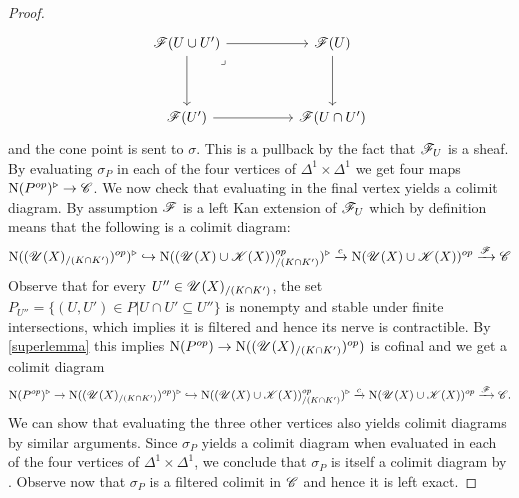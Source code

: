\documentclass[../thesis.tex]{subfiles}
\begin{document}
\begin{proof}
    \[
        \begin{tikzcd}
            {\F(U \cup U')} && {\F(U)} \\
            \\
            {\F(U')} && {\F(U\cap U')}
            \arrow[from=1-3, to=3-3]
            \arrow[from=3-1, to=3-3]
            \arrow[from=1-1, to=3-1]
            \arrow["\lrcorner"{anchor=center, pos=0.125}, draw=none, from=1-1, to=3-3]
            \arrow[from=1-1, to=1-3]
        \end{tikzcd}
    \]
    and the cone point is sent to $\sigma$. This is a pullback by the fact that $\mathscr{F}_{U}$ is a sheaf.
    By evaluating $\sigma_P$ in each of the four vertices of $\Delta^1 \times \Delta^1$ we get four maps $\mathrm{N}(P^{op})^{\triangleright} \to \mathscr{C}$.
    We now check that evaluating in the final vertex yields a colimit diagram.
    By assumption $\mathscr{F}$ is a left Kan extension of $\mathscr{F}_{U}$ which by definition means that the following is a colimit diagram:
    \[
        \mathrm{N}((\mathscr{U}(X)_{/(K\cap K')})^{op})^{\triangleright} \hookrightarrow \mathrm{N}((\mathscr{U}(X) \cup \mathscr{K}(X))^{op}_{/(K\cap K')})^{\triangleright} \xrightarrow{c} \mathrm{N}(\mathscr{U}(X) \cup \mathscr{K}(X))^{op} \xrightarrow{\mathscr{F}}\mathscr{C}
    \]
    Observe that for every $U'' \in \mathscr{U}(X)_{/(K\cap K')}$, the set
    $P_{U''} = \{(U,U') \in P | U\cap U' \subseteq U''\}$ is nonempty and stable under finite intersections, which implies it is filtered and hence its nerve is contractible.
    By \ref{superlemma} this implies $\mathrm{N}(P^{op}) \to \mathrm{N}((\mathscr{U}(X)_{/(K\cap K')})^{op})$ is cofinal and we get a colimit diagram
    \[
        \mathrm{N}(P^{op})^{\triangleright} \to\mathrm{N}((\mathscr{U}(X)_{/(K\cap K')})^{op})^{\triangleright} \hookrightarrow \mathrm{N}((\mathscr{U}(X) \cup \mathscr{K}(X))_{/(K\cap K')}^{op})^{\triangleright} \xrightarrow{c} \mathrm{N}(\mathscr{U}(X) \cup \mathscr{K}(X))^{op} \xrightarrow{\mathscr{F}}\mathscr{C}.
    \]
    We can show that evaluating the three other vertices also yields colimit diagrams by similar arguments.
    Since $\sigma_P$ yields a colimit diagram when evaluated in each of the four vertices of $\Delta^1 \times \Delta^1$, we conclude that $\sigma_P$ is itself a colimit diagram by \cite[Proposition 5.1.2.2]{HTT}.
    Observe now that $\sigma_P$ is a filtered colimit in $\mathscr{C}$ and hence it is left exact.

\end{proof}
\end{document}
